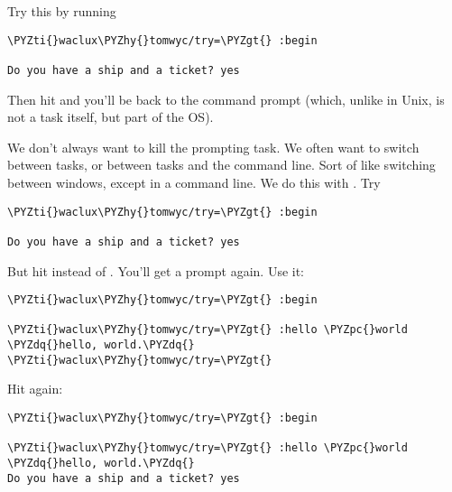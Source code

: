 Try this by running

\begin{framed_shaded}
\begin{Verbatim}[fontsize=\relsize{-2.5},fontseries=b,commandchars=\\\{\}]
\PYZti{}waclux\PYZhy{}tomwyc/try=\PYZgt{} :begin

Do you have a ship and a ticket? yes
\end{Verbatim}
\end{framed_shaded}

Then hit  and you'll be back to the command prompt (which,
unlike in Unix, is not a task itself, but part of the OS).

We don't always want to kill the prompting task.  We often want
to switch between tasks, or between tasks and the command line.
Sort of like switching between windows, except in a command line.
We do this with .  Try

\begin{framed_shaded}
\begin{Verbatim}[fontsize=\relsize{-2.5},fontseries=b,commandchars=\\\{\}]
\PYZti{}waclux\PYZhy{}tomwyc/try=\PYZgt{} :begin

Do you have a ship and a ticket? yes
\end{Verbatim}
\end{framed_shaded}

But hit  instead of .  You'll get a prompt again.  Use
it:

\begin{framed_shaded}
\begin{Verbatim}[fontsize=\relsize{-2.5},fontseries=b,commandchars=\\\{\}]
\PYZti{}waclux\PYZhy{}tomwyc/try=\PYZgt{} :begin

\PYZti{}waclux\PYZhy{}tomwyc/try=\PYZgt{} :hello \PYZpc{}world
\PYZdq{}hello, world.\PYZdq{}
\PYZti{}waclux\PYZhy{}tomwyc/try=\PYZgt{}
\end{Verbatim}
\end{framed_shaded}

Hit  again:

\begin{framed_shaded}
\begin{Verbatim}[fontsize=\relsize{-2.5},fontseries=b,commandchars=\\\{\}]
\PYZti{}waclux\PYZhy{}tomwyc/try=\PYZgt{} :begin

\PYZti{}waclux\PYZhy{}tomwyc/try=\PYZgt{} :hello \PYZpc{}world
\PYZdq{}hello, world.\PYZdq{}
Do you have a ship and a ticket? yes
\end{Verbatim}
\end{framed_shaded}

